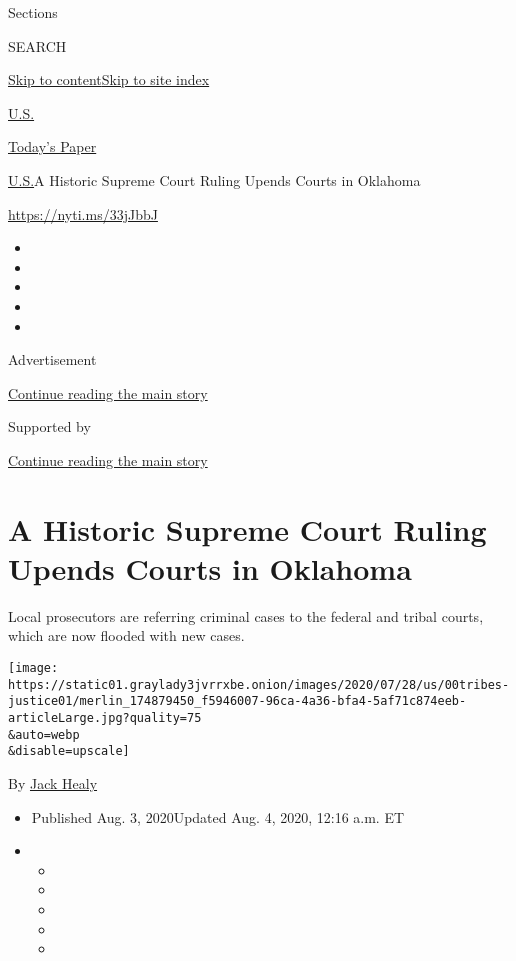 Sections

SEARCH

\protect\hyperlink{site-content}{Skip to
content}\protect\hyperlink{site-index}{Skip to site index}

\href{https://www.nytimes3xbfgragh.onion/section/us}{U.S.}

\href{https://myaccount.nytimes3xbfgragh.onion/auth/login?response_type=cookie\&client_id=vi}{}

\href{https://www.nytimes3xbfgragh.onion/section/todayspaper}{Today's
Paper}

\href{/section/us}{U.S.}\textbar{}A Historic Supreme Court Ruling Upends
Courts in Oklahoma

\url{https://nyti.ms/33jJbbJ}

\begin{itemize}
\item
\item
\item
\item
\item
\end{itemize}

Advertisement

\protect\hyperlink{after-top}{Continue reading the main story}

Supported by

\protect\hyperlink{after-sponsor}{Continue reading the main story}

\hypertarget{a-historic-supreme-court-ruling-upends-courts-in-oklahoma}{%
\section{A Historic Supreme Court Ruling Upends Courts in
Oklahoma}\label{a-historic-supreme-court-ruling-upends-courts-in-oklahoma}}

Local prosecutors are referring criminal cases to the federal and tribal
courts, which are now flooded with new cases.

\texttt{[image: https://static01.graylady3jvrrxbe.onion/images/2020/07/28/us/00tribes-justice01/merlin\_174879450\_f5946007-96ca-4a36-bfa4-5af71c874eeb-articleLarge.jpg?quality=75\\\&auto=webp\\\&disable=upscale]}

By \href{https://www.nytimes3xbfgragh.onion/by/jack-healy}{Jack Healy}

\begin{itemize}
\item
  Published Aug. 3, 2020Updated Aug. 4, 2020, 12:16 a.m. ET
\item
  \begin{itemize}
  \item
  \item
  \item
  \item
  \item
  \end{itemize}
\end{itemize}


